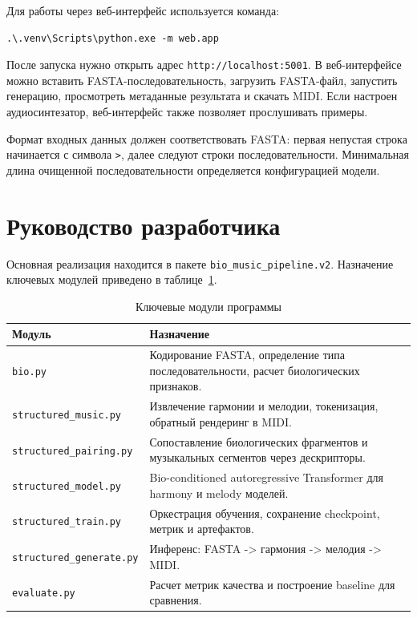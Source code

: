Для работы через веб-интерфейс используется команда:

\begin{verbatim}
.\.venv\Scripts\python.exe -m web.app
\end{verbatim}

После запуска нужно открыть адрес \texttt{http://localhost:5001}. В веб-интерфейсе можно вставить FASTA-последовательность, загрузить FASTA-файл, запустить генерацию, просмотреть метаданные результата и скачать MIDI. Если настроен аудиосинтезатор, веб-интерфейс также позволяет прослушивать примеры.

Формат входных данных должен соответствовать FASTA: первая непустая строка начинается с символа \texttt{>}, далее следуют строки последовательности. Минимальная длина очищенной последовательности определяется конфигурацией модели.

\section{Руководство разработчика}

Основная реализация находится в пакете \texttt{bio\_music\_pipeline.v2}. Назначение ключевых модулей приведено в таблице~\ref{tab:appendix-modules}.

\begin{table}[htbp]
\centering
\caption{Ключевые модули программы}
\label{tab:appendix-modules}
\begin{tabular}{|p{}|p{}|}
\hline
\textbf{Модуль} & \textbf{Назначение} \\
\hline
\texttt{bio.py} & Кодирование FASTA, определение типа последовательности, расчет биологических признаков. \\
\hline
\texttt{structured\_music.py} & Извлечение гармонии и мелодии, токенизация, обратный рендеринг в MIDI. \\
\hline
\texttt{structured\_pairing.py} & Сопоставление биологических фрагментов и музыкальных сегментов через дескрипторы. \\
\hline
\texttt{structured\_model.py} & Bio-conditioned autoregressive Transformer для harmony и melody моделей. \\
\hline
\texttt{structured\_train.py} & Оркестрация обучения, сохранение checkpoint, метрик и артефактов. \\
\hline
\texttt{structured\_generate.py} & Инференс: FASTA -> гармония -> мелодия -> MIDI. \\
\hline
\texttt{evaluate.py} & Расчет метрик качества и построение baseline для сравнения. \\
\hline
\end{tabular}
\end{table}

